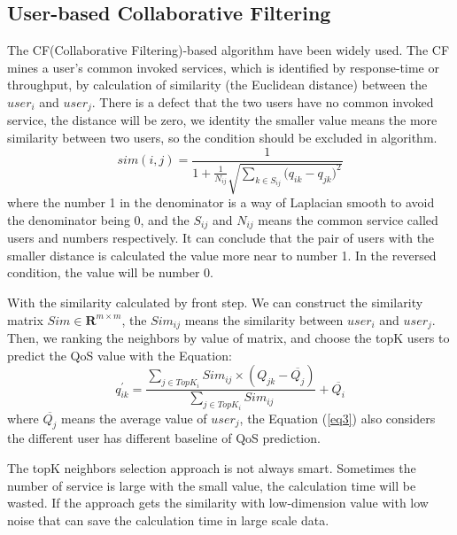 \documentclass[conference]{IEEEtran}
\begin{document}
\subsection{User-based Collaborative Filtering}
The CF(Collaborative Filtering)-based algorithm have been widely used. The CF mines a user's common invoked services, which is identified by response-time or throughput, by calculation of similarity (the Euclidean distance) between the $user_i$ and $user_j$. There is a defect that the two users have no common invoked service, the distance will be zero, we identity the smaller value means the more similarity between two users, so the condition should be excluded in algorithm. 
\begin{equation}
sim(i,j)=\frac{1}{
  1+\frac{1}{N_{ij}}\sqrt{\sum_{k \in S_{ij}}{(q_{ik}-q_{jk}})^{2}}
}  \label{eq2}
\end{equation}
where the number 1 in the denominator is a way of Laplacian smooth to avoid the denominator being 0, and the $S_{ij}$ and $N_{ij}$ means the common service called users and numbers respectively. It can conclude that the pair of users with the smaller distance is calculated the value more near to number 1. In the reversed condition, the value will be number 0.
\par With the similarity calculated by front step. We can construct the similarity matrix $Sim \in \textbf{R}^{m\times m}$, the $Sim_{ij}$ means the similarity between $user_{i}$ and $user_{j}$. Then, we ranking the neighbors by value of matrix, and choose the topK users to predict the QoS value with the Equation:
\begin{equation}
q^{'}_{ik}=\frac{
  \sum_{j \in TopK_{i}}{Sim_{ij} \times (Q_{jk}-\overline{Q_{j}})}
  }{
  \sum_{j \in TopK_{i}}{Sim_{ij}}
}+\overline{Q_{i}} 
\label{eq3}
\end{equation}
where $\overline{Q_{j}}$ means the average value of $user_{j}$, the Equation (\ref{eq3}) also considers the different user has different baseline of QoS prediction. 
\par The topK neighbors selection approach is not always smart. Sometimes the number of service is large with the small value, the calculation time will be wasted. If the approach gets the similarity with low-dimension value with low noise that can save the calculation time in large scale data.
\end{document}
